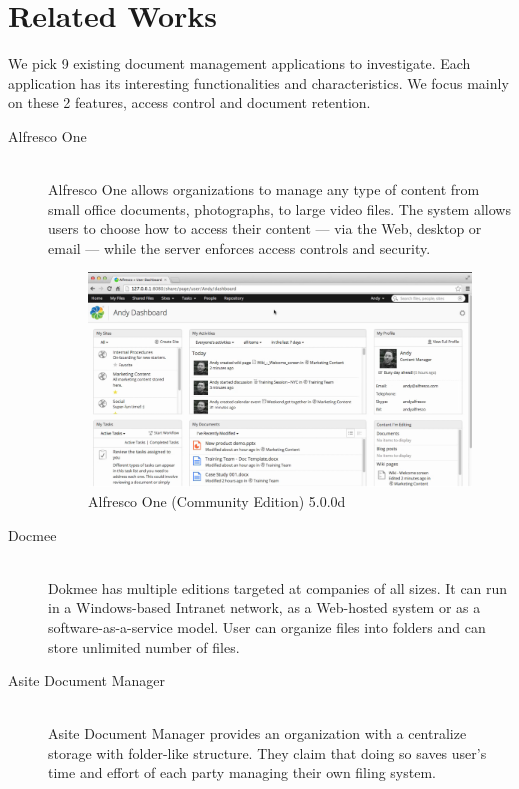 \section{Related Works} \label{relate-works}
We pick 9 existing document management applications to investigate.
Each application has its interesting functionalities and characteristics.
We focus mainly on these 2 features, access control and document retention.
\begin{description}
\item[Alfresco One] \hfill \\
Alfresco One allows organizations to manage any type of content from small office documents, photographs, to large video files.
The system allows users to choose how to access their content --- via the Web, desktop or email --- while the server enforces access controls and security.
\begin{figure}[ht]
	\centering
	\includegraphics[scale=0.4]{res/literature/screenshot_alfresco}
	\caption{Alfresco One (Community Edition) 5.0.0d \cite{alfresco}}
\end{figure}

\item[Docmee] \hfill \\
Dokmee has multiple editions targeted at companies of all sizes.
It can run in a Windows-based Intranet network, as a Web-hosted system or as a software-as-a-service model.
User can organize files into folders and can store unlimited number of files.

\item[Asite Document Manager] \hfill \\
Asite Document Manager provides an organization with a centralize storage with folder-like structure.
They claim that doing so saves user's time and effort of each party managing their own filing system.


\end{description}
